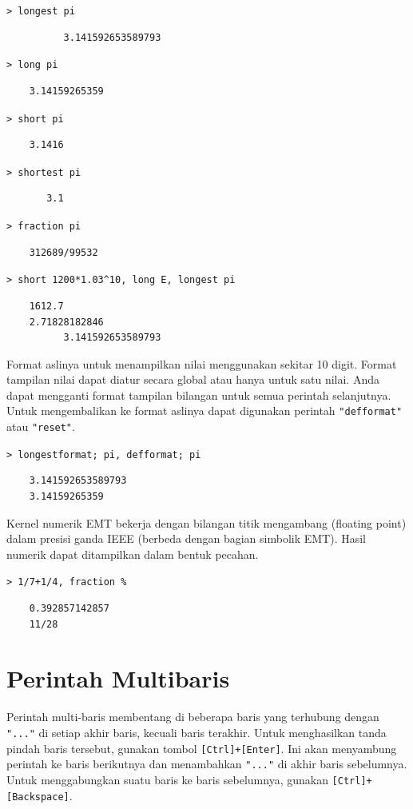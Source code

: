 \documentclass[11pt, a4paper]{article}
\newcommand{\emtcmd}[1]{\noindent\texttt{\textcolor{emtcommand}{>}\ #1}\par\smallskip}
\begin{document}
\emtcmd{longest pi}
\begin{verbatim}
          3.141592653589793
\end{verbatim}

\emtcmd{long pi}
\begin{verbatim}
    3.14159265359
\end{verbatim}

\emtcmd{short pi}
\begin{verbatim}
    3.1416
\end{verbatim}

\emtcmd{shortest pi}
\begin{verbatim}
       3.1
\end{verbatim}

\emtcmd{fraction pi}
\begin{verbatim}
    312689/99532
\end{verbatim}

\emtcmd{short 1200*1.03\^{}10, long E, longest pi}
\begin{verbatim}
    1612.7
    2.71828182846
          3.141592653589793
\end{verbatim}

Format aslinya untuk menampilkan nilai menggunakan sekitar 10 digit. Format tampilan nilai dapat diatur secara global atau hanya untuk satu nilai. Anda dapat mengganti format tampilan bilangan untuk semua perintah selanjutnya. Untuk mengembalikan ke format aslinya dapat digunakan perintah \texttt{"defformat"} atau \texttt{"reset"}.

\emtcmd{longestformat; pi, defformat; pi}
\begin{verbatim}
    3.141592653589793
    3.14159265359
\end{verbatim}

Kernel numerik EMT bekerja dengan bilangan titik mengambang (floating point) dalam presisi ganda IEEE (berbeda dengan bagian simbolik EMT). Hasil numerik dapat ditampilkan dalam bentuk pecahan.

\emtcmd{1/7+1/4, fraction \%}
\begin{verbatim}
    0.392857142857
    11/28
\end{verbatim}

\section*{Perintah Multibaris}

Perintah multi-baris membentang di beberapa baris yang terhubung dengan \texttt{"..."} di setiap akhir baris, kecuali baris terakhir. Untuk menghasilkan tanda pindah baris tersebut, gunakan tombol \texttt{[Ctrl]+[Enter]}. Ini akan menyambung perintah ke baris berikutnya dan menambahkan \texttt{"..."} di akhir baris sebelumnya. Untuk menggabungkan suatu baris ke baris sebelumnya, gunakan \texttt{[Ctrl]+[Backspace]}.
\end{document}
